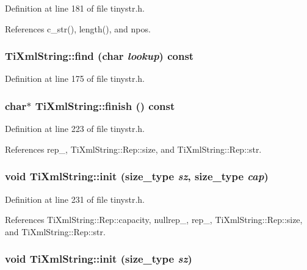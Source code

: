 Definition at line 181 of file tinystr.h.

References c\_\-str(), length(), and npos.\hypertarget{class_ti_xml_string_a5c2b368b5eafe075fd9565cbcbd4c2f9}{
\subsubsection[{find}]{ TiXmlString::find (char {\em lookup}) const}}
\label{class_ti_xml_string_a5c2b368b5eafe075fd9565cbcbd4c2f9}


Definition at line 175 of file tinystr.h.\hypertarget{class_ti_xml_string_a58faf1c6b9828c8d5d5092bebf146167}{
\subsubsection[{finish}]{\setlength{\rightskip}{0pt plus 5cm}char$\ast$ TiXmlString::finish () const}}
\label{class_ti_xml_string_a58faf1c6b9828c8d5d5092bebf146167}


Definition at line 223 of file tinystr.h.

References rep\_\-, TiXmlString::Rep::size, and TiXmlString::Rep::str.\hypertarget{class_ti_xml_string_ae11cd23e090fd2e7bb62eda05b45a2d6}{
\subsubsection[{init}]{\setlength{\rightskip}{0pt plus 5cm}void TiXmlString::init ({\bf size\_\-type} {\em sz}, \/  {\bf size\_\-type} {\em cap})}}
\label{class_ti_xml_string_ae11cd23e090fd2e7bb62eda05b45a2d6}


Definition at line 231 of file tinystr.h.

References TiXmlString::Rep::capacity, nullrep\_\-, rep\_\-, TiXmlString::Rep::size, and TiXmlString::Rep::str.\hypertarget{class_ti_xml_string_a694eacb51c43d8eba8aa7d4552b598ff}{
\subsubsection[{init}]{\setlength{\rightskip}{0pt plus 5cm}void TiXmlString::init ({\bf size\_\-type} {\em sz})}}
\label{class_ti_xml_string_a694eacb51c43d8eba8aa7d4552b598ff}


